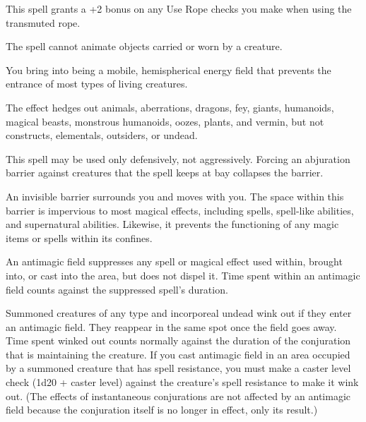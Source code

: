 \begin{multicols}{2}
\begin{small}
\smallskip\noindent This spell grants a +2 bonus on any Use Rope checks you make when using the transmuted rope.

\smallskip\noindent The spell cannot animate objects carried or worn by a creature.

\noindent You bring into being a mobile, hemispherical energy field that prevents the entrance of most types of living creatures.

\smallskip\noindent The effect hedges out animals, aberrations, dragons, fey, giants, humanoids, magical beasts, monstrous humanoids, oozes, plants, and vermin, but not constructs, elementals, outsiders, or undead.

\smallskip\noindent This spell may be used only defensively, not aggressively. Forcing an abjuration barrier against creatures that the spell keeps at bay collapses the barrier.

\noindent An invisible barrier surrounds you and moves with you. The space within this barrier is impervious to most magical effects, including spells, spell-like abilities, and supernatural abilities. Likewise, it prevents the functioning of any magic items or spells within its confines.

\smallskip\noindent An antimagic field suppresses any spell or magical effect used within, brought into, or cast into the area, but does not dispel it. Time spent within an antimagic field counts against the suppressed spell's duration.

\smallskip\noindent Summoned creatures of any type and incorporeal undead wink out if they enter an antimagic field. They reappear in the same spot once the field goes away. Time spent winked out counts normally against the duration of the conjuration that is maintaining the creature. If you cast antimagic field in an area occupied by a summoned creature that has spell resistance, you must make a caster level check (1d20 + caster level) against the creature's spell resistance to make it wink out. (The effects of instantaneous conjurations are not affected by an antimagic field because the conjuration itself is no longer in effect, only its result.)


\end{small}
\end{multicols}
